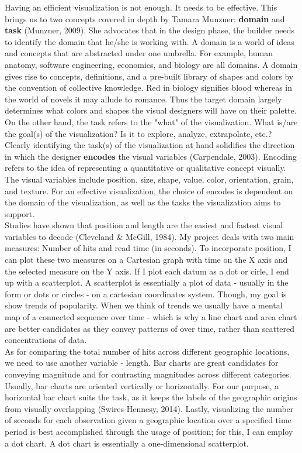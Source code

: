 \documentclass[12pt]{article}
\begin{document}
Having an efficient visualization is not enough. It needs to be effective. This brings us to two concepts covered in depth by Tamara Munzner: \textbf{domain} and \textbf{task} (Munzner, 2009). She advocates that in the design phase, the builder needs to identify the domain that he/she is working with. A domain is a world of ideas and concepts that are abstracted under one umbrella. For example, human anatomy, software engineering, economics, and biology are all domains. A domain gives rise to concepts, definitions, and a pre-built library of shapes and colors by the convention of collective knowledge. Red in biology signifies blood whereas in the world of novels it may allude to romance. Thus the target domain largely determines what colors and shapes the visual designers will have on their palette. \\
On the other hand, the task refers to the "what" of the visualization. What is/are the goal(s) of the visualization? Is it to explore, analyze, extrapolate, etc.? Clearly identifying the task(s) of the visualization at hand solidifies the direction in which the designer \textbf{encodes} the visual variables (Carpendale, 2003). Encoding refers to the idea of representing a quantitative or qualitative concept visually. The visual variables include position, size, shape, value, color, orientation, grain, and texture. For an effective visualization, the choice of encodes is dependent on the domain of the visualization, as well as the tasks the visualization aims to support. \\
Studies have shown that position and length are the easiest and fastest visual variables to decode (Cleveland \& McGill, 1984). My project deals with two main measures: Number of hits and read time (in seconds). To incorporate position, I can plot these two measures on a Cartesian graph with time on the X axis and the selected measure on the Y axis. If I plot each datum as a dot or cirle, I end up with a scatterplot. A scatterplot is essentially a plot of data - usually in the form or dots or circles - on a cartesian coordinates system. Though, my goal is show trends of popularity. When we think of trends we usually have a mental map of a connected sequence over time - which is why a line chart and area chart are better candidates as they convey patterns of over time, rather than scattered concentrations of data. \\
\noindent As for comparing the total number of hits across different geographic locations, we need to use another variable - length. Bar charts are great candidates for conveying magnitude and for contrasting magnitudes across different categories. Usually, bar charts are oriented vertically or horizontally. For our purpose, a horizontal bar chart suits the task, as it keeps the labels of the geographic origins from visually overlapping (Swires-Hennesy, 2014). Lastly, visualizing the number of seconds for each observation given a geographic location over a specified time period is best accomplished through the usage of position; for this, I can employ a dot chart. A dot chart is essentially a one-dimensional scatterplot. \\
\end{document}

